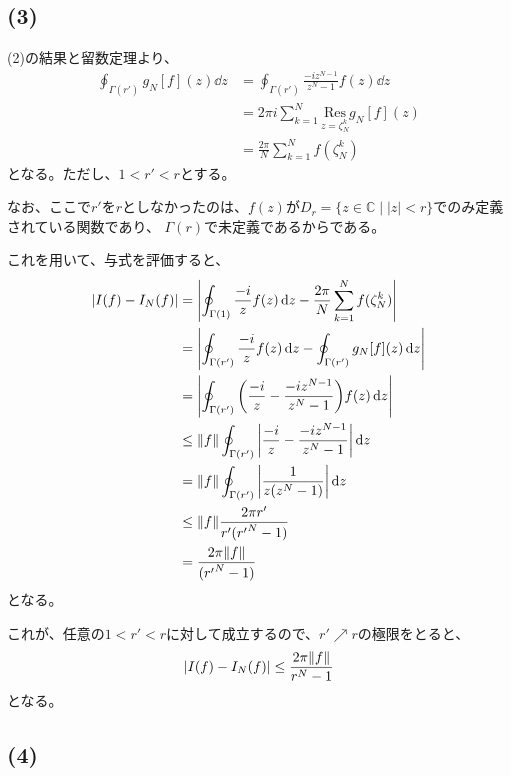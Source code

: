 \documentclass[a4paper, 10pt, dvipdfmx]{jlreq}
\begin{document}
\subsection*{(3)}

(2)の結果と留数定理より、
\begin{align*}
  \oint_{\Gamma(r')}g_N[f](z) \dd{z} & = \oint_{\Gamma(r')}\frac{-iz^{N-1}}{z^N-1}f(z)\dd{z}                    \\
                                     & = 2\pi i \sum_{k=1}^{N} \underset{z = \zeta_N^k}{\mathrm{Res}} g_N[f](z) \\
                                     & = \frac{2\pi}{N} \sum_{k=1}^{N} f(\zeta_N^k)
\end{align*}
となる。ただし、$1<r'<r$とする。

なお、ここで$r'$を$r$としなかったのは、$f(z)$が$D_r=\{ z\in\mathbb{C} \; | \; |z| < r \}$でのみ定義されている関数であり、
$\Gamma(r)$で未定義であるからである。

これを用いて、与式を評価すると、
\begin{align*}
  \abs{I(f)-I_N(f)} & =\abs{\oint_{\Gamma(1)} \frac{-i}{z}f(z) \dd{z} - \frac{2\pi}{N} \sum_{k=1}^{N} f(\zeta_N^k)} \\
                    & =\abs{\oint_{\Gamma(r')} \frac{-i}{z}f(z) \dd{z} - \oint_{\Gamma(r')} g_N[f](z) \dd{z}}       \\
                    & =\abs{\oint_{\Gamma(r')} \qty(\frac{-i}{z} - \frac{-iz^{N-1}}{z^N-1})f(z) \dd{z}}             \\
                    & \leq \norm{f} \oint_{\Gamma(r')} \abs{\frac{-i}{z} - \frac{-iz^{N-1}}{z^N-1}} \dd{z}          \\
                    & = \norm{f} \oint_{\Gamma(r')} \abs{\frac{1}{z(z^N-1)}} \dd{z}                                 \\
                    & \leq \norm{f} \frac{2\pi r'}{r'({r'}^N-1)}                                                    \\
                    & =  \frac{2\pi\norm{f}}{({r'}^N-1)}
\end{align*}
となる。

これが、任意の$1<r'<r$に対して成立するので、$r' \nearrow r$の極限をとると、
\begin{equation*}
  \abs{I(f)-I_N(f)} \leq \frac{2\pi\norm{f}}{r^{N}-1}
\end{equation*}
となる。

\subsection*{(4)}
\end{document}
